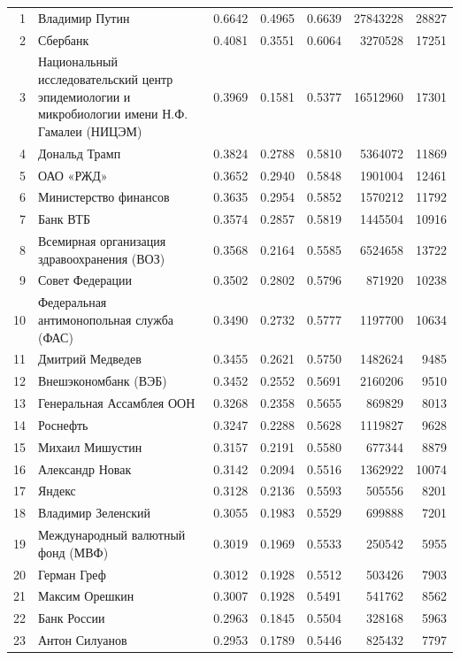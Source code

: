 {\begin{longtable}{r >{\raggedright\arraybackslash}p{4.2cm} S[table-format=1.4] S[table-format=1.4] S[table-format=1.4] r r}
1 & Владимир Путин & 0.6642 & 0.4965 & 0.6639 & 27843228 & 28827 \\
2 & Сбербанк & 0.4081 & 0.3551 & 0.6064 & 3270528 & 17251 \\
3 & Национальный исследовательский центр эпидемиологии и микробиологии имени Н.Ф. Гамалеи (НИЦЭМ) & 0.3969 & 0.1581 & 0.5377 & 16512960 & 17301 \\
4 & Дональд Трамп & 0.3824 & 0.2788 & 0.5810 & 5364072 & 11869 \\
5 & ОАО «РЖД» & 0.3652 & 0.2940 & 0.5848 & 1901004 & 12461 \\
6 & Министерство финансов & 0.3635 & 0.2954 & 0.5852 & 1570212 & 11792 \\
7 & Банк ВТБ & 0.3574 & 0.2857 & 0.5819 & 1445504 & 10916 \\
8 & Всемирная организация здравоохранения (ВОЗ) & 0.3568 & 0.2164 & 0.5585 & 6524658 & 13722 \\
9 & Совет Федерации & 0.3502 & 0.2802 & 0.5796 & 871920 & 10238 \\
10 & Федеральная антимонопольная служба (ФАС) & 0.3490 & 0.2732 & 0.5777 & 1197700 & 10634 \\
11 & Дмитрий Медведев & 0.3455 & 0.2621 & 0.5750 & 1482624 & 9485 \\
12 & Внешэкономбанк (ВЭБ) & 0.3452 & 0.2552 & 0.5691 & 2160206 & 9510 \\
13 & Генеральная Ассамблея ООН & 0.3268 & 0.2358 & 0.5655 & 869829 & 8013 \\
14 & Роснефть & 0.3247 & 0.2288 & 0.5628 & 1119827 & 9628 \\
15 & Михаил Мишустин & 0.3157 & 0.2191 & 0.5580 & 677344 & 8879 \\
16 & Александр Новак & 0.3142 & 0.2094 & 0.5516 & 1362922 & 10074 \\
17 & Яндекс & 0.3128 & 0.2136 & 0.5593 & 505556 & 8201 \\
18 & Владимир Зеленский & 0.3055 & 0.1983 & 0.5529 & 699888 & 7201 \\
19 & Международный валютный фонд (МВФ) & 0.3019 & 0.1969 & 0.5533 & 250542 & 5955 \\
20 & Герман Греф & 0.3012 & 0.1928 & 0.5512 & 503426 & 7903 \\
21 & Максим Орешкин & 0.3007 & 0.1928 & 0.5491 & 541762 & 8562 \\
22 & Банк России & 0.2963 & 0.1845 & 0.5504 & 328168 & 5963 \\
23 & Антон Силуанов & 0.2953 & 0.1789 & 0.5446 & 825432 & 7797 \\

\end{longtable}}
